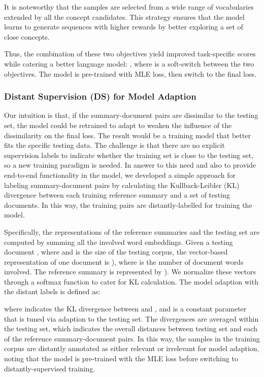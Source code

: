 \documentclass[11pt,a4paper]{article}
\begin{document}
It is noteworthy that the samples  are selected from a wide range of vocabularies extended by all the concept candidates. This strategy ensures that the model learns to generate sequences with  higher rewards by better exploring a set of close concepts.  

Thus, the combination of these two objectives yield improved
task-specific scores while catering a better language model: 
, 
where  is a soft-switch between the two objectives.  The model  is pre-trained with MLE loss, then switch to the final loss. 

\subsubsection{Distant Supervision (DS) for Model Adaption} 



Our intuition is that, if the summary-document pairs are dissimilar to the testing set, the model  could be retrained to adapt  to weaken the influence of the dissimilarity on the final loss.   
The result would be a training model that better fits the specific testing data. The challenge is that there are no explicit supervision labels to indicate whether the training set is close to the testing set, so a new training paradigm is needed. In answer to this need and also to provide end-to-end functionality in the model, we developed a simple approach for labeling summary-document pairs by calculating the Kullback-Leibler (KL) divergence between each training reference summary and a set of testing documents. In this way, the training pairs are distantly-labelled for training the model.



Specifically, the representations of the reference summaries and the testing set are computed by summing all the involved word embeddings. Given a testing document , where  and  is the size of the testing corpus, the vector-based representation of one document is  ), where  is the number of document words involved. The reference summary is represented by ). We  normalize these vectors through a softmax function to cater for KL calculation. The model adaption with the distant labels is defined as:


 
where  indicates the KL divergence  between  and , and  is a constant parameter that is tuned via adaption to the testing set. The divergences are averaged within the testing set, which indicates the overall distances between testing set and each of the reference summary-document pairs.
In this way, the samples in the training corpus are distantly annotated as either relevant or irrelevant for model adaption, noting that the model is pre-trained with the MLE loss before switching to distantly-supervised training. 
\end{document}
